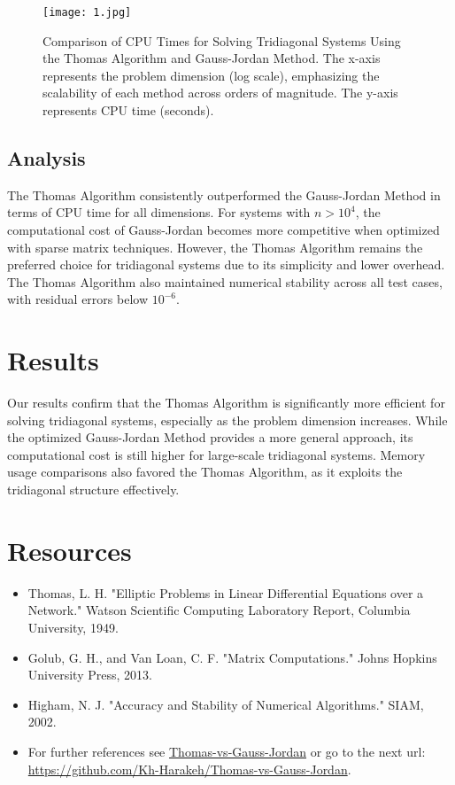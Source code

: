 \documentclass[a4paper,12pt]{article}
\begin{document}
\begin{figure}[H]
\centering
\texttt{[image: 1.jpg]}
\caption{Comparison of CPU Times for Solving Tridiagonal Systems Using the Thomas Algorithm and Gauss-Jordan Method. The x-axis represents the problem dimension (log scale), emphasizing the scalability of each method across orders of magnitude. The y-axis represents CPU time (seconds).}
\label{fig:comparison_plot}
\end{figure}

\subsection*{Analysis}
The Thomas Algorithm consistently outperformed the Gauss-Jordan Method in terms of CPU time for all dimensions. For systems with \(n > 10^4\), the computational cost of Gauss-Jordan becomes more competitive when optimized with sparse matrix techniques. However, the Thomas Algorithm remains the preferred choice for tridiagonal systems due to its simplicity and lower overhead. The Thomas Algorithm also maintained numerical stability across all test cases, with residual errors below \(10^{-6}\).

\section*{Results}
Our results confirm that the Thomas Algorithm is significantly more efficient for solving tridiagonal systems, especially as the problem dimension increases. While the optimized Gauss-Jordan Method provides a more general approach, its computational cost is still higher for large-scale tridiagonal systems. Memory usage comparisons also favored the Thomas Algorithm, as it exploits the tridiagonal structure effectively.

\section*{Resources}
\begin{itemize}
    \item Thomas, L. H. "Elliptic Problems in Linear Differential Equations over a Network." Watson Scientific Computing Laboratory Report, Columbia University, 1949.
    \item Golub, G. H., and Van Loan, C. F. "Matrix Computations." Johns Hopkins University Press, 2013.
    \item Higham, N. J. "Accuracy and Stability of Numerical Algorithms." SIAM, 2002.
    \item For further references see \href{https://github.com/Kh-Harakeh/Thomas-vs-Gauss-Jordan}{Thomas-vs-Gauss-Jordan} 
or go to the next url: \url{https://github.com/Kh-Harakeh/Thomas-vs-Gauss-Jordan}.
\end{itemize}
\end{document}
